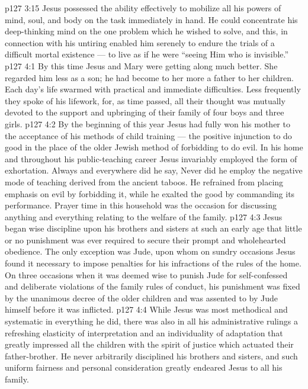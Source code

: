 \vs p127 3:15 Jesus possessed the ability effectively to mobilize all his powers of mind, soul, and body on the task immediately in hand. He could concentrate his deep\hyp{}thinking mind on the one problem which he wished to solve, and this, in connection with his untiring  enabled him serenely to endure the trials of a difficult mortal existence --- to live as if he were “seeing Him who is invisible.”
\vs p127 4:1 By this time Jesus and Mary were getting along much better. She regarded him less as a son; he had become to her more a father to her children. Each day’s life swarmed with practical and immediate difficulties. Less frequently they spoke of his lifework, for, as time passed, all their thought was mutually devoted to the support and upbringing of their family of four boys and three girls.
\vs p127 4:2 By the beginning of this year Jesus had fully won his mother to the acceptance of his methods of child training --- the positive injunction to do good in the place of the older Jewish method of forbidding to do evil. In his home and throughout his public\hyp{}teaching career Jesus invariably employed the  form of exhortation. Always and everywhere did he say,  Never did he employ the negative mode of teaching derived from the ancient taboos. He refrained from placing emphasis on evil by forbidding it, while he exalted the good by commanding its performance. Prayer time in this household was the occasion for discussing anything and everything relating to the welfare of the family.
\vs p127 4:3 Jesus began wise discipline upon his brothers and sisters at such an early age that little or no punishment was ever required to secure their prompt and wholehearted obedience. The only exception was Jude, upon whom on sundry occasions Jesus found it necessary to impose penalties for his infractions of the rules of the home. On three occasions when it was deemed wise to punish Jude for self\hyp{}confessed and deliberate violations of the family rules of conduct, his punishment was fixed by the unanimous decree of the older children and was assented to by Jude himself before it was inflicted.
\vs p127 4:4 While Jesus was most methodical and systematic in everything he did, there was also in all his administrative rulings a refreshing elasticity of interpretation and an individuality of adaptation that greatly impressed all the children with the spirit of justice which actuated their father\hyp{}brother. He never arbitrarily disciplined his brothers and sisters, and such uniform fairness and personal consideration greatly endeared Jesus to all his family.
